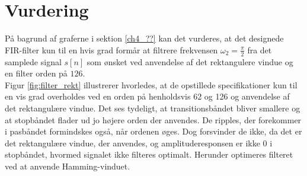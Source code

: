 \section{Vurdering}
På bagrund af graferne i sektion \ref{ch4_??} kan det vurderes, at det designede FIR-filter kun til en hvis grad formår at filtrere frekvensen $\omega_2=\frac{\pi}{2}$ fra det samplede signal $s[n]$ som ønsket ved anvendelse af det rektangulere vindue og en filter orden på $126$. \\
Figur \ref{fig:filter_rekt} illustrerer hvorledes, at de opstillede specifikationer kun til en vis grad overholdes ved en orden på henholdsvis 62 og 126 og anvendelse af det rektangulære vindue. Det ses tydeligt, at transitionsbåndet bliver smallere og at stopbåndet flader ud jo højere orden der anvendes. De ripples, der forekommer i pasbåndet formindskes også, når ordenen øges. Dog forsvinder de ikke, da det er det rektangulære vindue, der anvendes, og amplituderesponsen er ikke 0 i stopbåndet,
hvormed signalet ikke filteres optimalt. Herunder optimeres filteret ved at anvende Hamming-vinduet.

